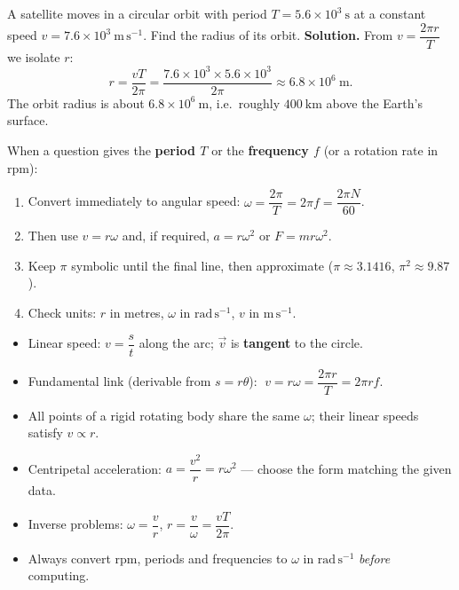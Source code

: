 \documentclass[11pt]{article}
\begin{document}
\begin{exoresolu}
A satellite moves in a circular orbit with period $T = 5.6\times 10^{3}\ \mathrm{s}$ at a constant speed $v = 7.6\times 10^{3}\ \mathrm{m\,s^{-1}}$. Find the radius of its orbit.
\tcblower
\textbf{Solution.} From $v = \dfrac{2\pi r}{T}$ we isolate $r$:
\[ r = \frac{vT}{2\pi} = \frac{7.6\times 10^{3} \times 5.6\times 10^{3}}{2\pi} \approx 6.8\times 10^{6}\ \mathrm{m}. \]
The orbit radius is about $6.8\times 10^{6}\ \mathrm{m}$, i.e.\ roughly $400\ \mathrm{km}$ above the Earth's surface.
\end{exoresolu}

\begin{methode}
When a question gives the \textbf{period $T$} or the \textbf{frequency $f$} (or a rotation rate in rpm):
\begin{enumerate}
\item Convert immediately to angular speed: $\omega = \dfrac{2\pi}{T} = 2\pi f = \dfrac{2\pi N}{60}$.
\item Then use $v = r\omega$ and, if required, $a = r\omega^{2}$ or $F = mr\omega^{2}$.
\item Keep $\pi$ symbolic until the final line, then approximate ($\pi \approx 3.1416$, $\pi^{2} \approx 9.87$).
\item Check units: $r$ in metres, $\omega$ in $\mathrm{rad\,s^{-1}}$, $v$ in $\mathrm{m\,s^{-1}}$.
\end{enumerate}
\end{methode}

\begin{aretenir}
\begin{itemize}
\item Linear speed: $v = \dfrac{s}{t}$ along the arc; $\vec{v}$ is \textbf{tangent} to the circle.
\item Fundamental link (derivable from $s = r\theta$): $\;v = r\omega = \dfrac{2\pi r}{T} = 2\pi r f$.
\item All points of a rigid rotating body share the same $\omega$; their linear speeds satisfy $v \propto r$.
\item Centripetal acceleration: $a = \dfrac{v^{2}}{r} = r\omega^{2}$ --- choose the form matching the given data.
\item Inverse problems: $\omega = \dfrac{v}{r}$, $r = \dfrac{v}{\omega} = \dfrac{vT}{2\pi}$.
\item Always convert rpm, periods and frequencies to $\omega$ in $\mathrm{rad\,s^{-1}}$ \emph{before} computing.
\end{itemize}
\end{aretenir}
\end{document}
